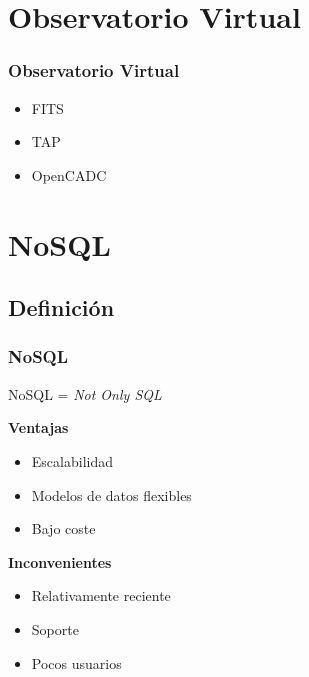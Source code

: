 \documentclass[serif,12pt]{beamer}
\begin{document}
\section{Observatorio Virtual}
\begin{frame}
\frametitle{Observatorio Virtual}

\begin{itemize}
\item FITS
\item TAP
\item OpenCADC
\end{itemize}

\end{frame}


\section{NoSQL}
\subsection{Definición}
\begin{frame}
\frametitle{NoSQL}

NoSQL = \emph{Not Only SQL}

\begin{multicols}{2}

\textbf{Ventajas}
\begin{itemize}
\item Escalabilidad
\item Modelos de datos flexibles
\item Bajo coste
\end{itemize}

\textbf{Inconvenientes}
\begin{itemize}
\item Relativamente reciente
\item Soporte
\item Pocos usuarios
\end{itemize}

\end{multicols}

\end{frame}



\end{document}
